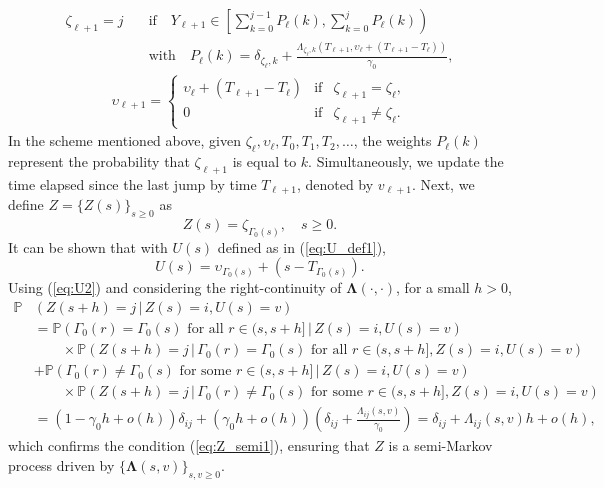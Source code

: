 \documentclass[11pt,leqno]{amsart}
\numberwithin{table}{section}
\numberwithin{figure}{section}
\numberwithin{equation}{section}
\newcommand{\1}{{\mathds{1}}}
\newcommand{\0}{\mat{0}}
\begin{document}
\begin{align*}
\zeta_{\ell+1} = j\quad&\text{if}\quad Y_{\ell+1}\in \left[\sum_{k=0}^{j-1} P_\ell (k), \sum_{k=0}^{j} P_\ell(k)\right)\\&\text{with}\quad P_\ell(k)=\delta_{\zeta_\ell, k} + \frac{\Lambda_{\zeta_\ell, k}(T_{\ell+1}, \upsilon_{\ell} + (T_{\ell+1}-T_\ell))}{\gamma_0},\end{align*}
\begin{align*}
\upsilon_{\ell+1} = \left\{\begin{array}{ccc} \upsilon_{\ell} + (T_{\ell+1}-T_\ell) & \text{if} & \zeta_{\ell+1}=\zeta_{\ell},\\
0 & \text{if} & \zeta_{\ell+1}\neq\zeta_{\ell}. \end{array}\right.
\end{align*}
In the scheme mentioned above, given $\zeta_\ell, \upsilon_{\ell}, T_0, T_1, T_2,\dots$, the weights $P_{\ell}(k)$ represent the probability that $\zeta_{\ell+1}$ is equal to $k$. Simultaneously, we update the time elapsed since the last jump by time $T_{\ell+1}$, denoted by $v_{\ell +1}$. Next, we define $Z=\{Z(s)\}_{s\ge 0}$ as
\begin{equation}\label{eq:Zunif1}Z(s)= \zeta_{\Gamma_0(s)},\quad s\ge 0.\end{equation}
It can be shown that with $U(s)$ defined as in (\ref{eq:U_def1}),
\begin{equation}\label{eq:U2}U(s)=\upsilon_{\Gamma_0(s)} + (s-T_{\Gamma_0(s)}).\end{equation}
Using (\ref{eq:U2}) and considering the right-continuity of $\bm{\Lambda}(\cdot,\cdot)$, for a small $h>0$,
\begin{align*} 
\mathds{P}&\left(Z(s+h)=j\,|\, Z(s)=i, U(s)=v\right)\\
& = \mathds{P}\left( \Gamma_0(r)=\Gamma_0(s)\text{ for all }r\in(s,s+h] \,|\, Z(s)=i, U(s)=v\right)\\
&\qquad \times \mathds{P}\left(Z(s+h)=j \,|\, \Gamma_0(r)=\Gamma_0(s)\text{ for all }r\in(s,s+h], Z(s)=i, U(s)=v\right)\\
& + \mathds{P}\left( \Gamma_0(r)\neq \Gamma_0(s)\text{ for some }r\in(s,s+h]  \,|\,  Z(s)=i, U(s)=v\right) \\
&\qquad \times \mathds{P}\left(Z(s+h)=j\,|\, \Gamma_0(r)\neq \Gamma_0(s)\text{ for some }r\in(s,s+h],  Z(s)=i, U(s)=v\right) \\
& = (1-\gamma_0 h + o(h))\delta_{ij} + (\gamma_0h + o(h))\left(\delta_{ij} + \frac{\Lambda_{ij}(s, v)}{\gamma_0}\right) = \delta_{ij} + \Lambda_{ij}(s, v) h + o(h),
\end{align*}
which confirms the condition (\ref{eq:Z_semi1}), ensuring that $Z$ is a semi-Markov process driven by $\{\bm{\Lambda}(s,v)\}_{s,v\ge 0}$.
\end{document}
